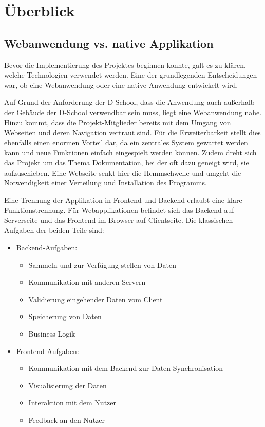 \section{Überblick}

\subsection{Webanwendung vs. native Applikation}
Bevor die Implementierung des Projektes beginnen konnte, galt es zu klären, welche Technologien verwendet werden. Eine der grundlegenden Entscheidungen war, ob eine Webanwendung oder eine native Anwendung entwickelt wird. 

Auf Grund der Anforderung der D-School, dass die Anwendung auch außerhalb der Gebäude der D-School verwendbar sein muss, liegt eine Webanwendung nahe. Hinzu kommt, dass die Projekt-Mitglieder bereits mit dem Umgang von Webseiten und deren Navigation vertraut sind. Für die Erweiterbarkeit stellt dies ebenfalls einen enormen Vorteil dar, da ein zentrales System gewartet werden kann und neue Funktionen einfach eingespielt werden können. Zudem dreht sich das Projekt um das Thema Dokumentation, bei der oft dazu geneigt wird, sie aufzuschieben. Eine Webseite senkt hier die Hemmschwelle und umgeht die Notwendigkeit einer Verteilung und Installation des Programms.

Eine Trennung der Applikation in Frontend und Backend erlaubt eine klare Funktionstrennung. Für Webapplikationen befindet sich das Backend auf Serverseite und das Frontend im Browser auf Clientseite. Die klassischen Aufgaben der beiden Teile sind:

\begin{itemize}
  \item Backend-Aufgaben:
  \begin{itemize}
    \item Sammeln und zur Verfügung stellen von Daten
    \item Kommunikation mit anderen Servern
    \item Validierung eingehender Daten vom Client
    \item Speicherung von Daten
    \item Business-Logik
  \end{itemize}

\item Frontend-Aufgaben:
  \begin{itemize}
    \item Kommunikation mit dem Backend zur Daten-Synchronisation 
\item Visualisierung der Daten
    \item Interaktion mit dem Nutzer
    \item Feedback an den Nutzer
  \end{itemize}
\end{itemize}

